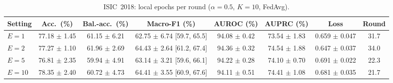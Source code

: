 \begin{table}[!t]
\caption{ISIC~2018: local epochs per round ($\alpha{=}0.5$, $K{=}10$, FedAvg).}
\label{tab:18-localepochs}
\centering
\footnotesize
\begin{tabular}{lccccccc}
\toprule
Setting & Acc.\ (\%) & Bal.-acc.\ (\%) & Macro-F1 (\%) & AUROC (\%) & AUPRC (\%) & Loss & Round \\
\midrule
$E=1$ & 77.18 $\pm$ 1.45 & 61.15 $\pm$ 6.21 & 62.75 $\pm$ 6.74 [59.7, 65.5] & 94.08 $\pm$ 0.42 & 73.54 $\pm$ 1.83 & 0.659 $\pm$ 0.047 & 31.7 \\
$E=2$ & 77.27 $\pm$ 1.10 & 61.96 $\pm$ 2.69 & 64.43 $\pm$ 2.64 [61.2, 67.4] & 94.36 $\pm$ 0.32 & 74.54 $\pm$ 1.88 & 0.647 $\pm$ 0.037 & 34.0 \\
$E=5$ & 76.81 $\pm$ 2.35 & 59.94 $\pm$ 4.91 & 63.14 $\pm$ 3.21 [59.6, 66.1] & 94.22 $\pm$ 0.28 & 74.10 $\pm$ 0.70 & 0.691 $\pm$ 0.022 & 22.3 \\
$E=10$ & 78.35 $\pm$ 2.40 & 60.72 $\pm$ 4.73 & 64.41 $\pm$ 3.55 [60.9, 67.6] & 94.11 $\pm$ 0.51 & 74.41 $\pm$ 1.08 & 0.681 $\pm$ 0.035 & 21.7 \\
\bottomrule
\end{tabular}
\end{table}